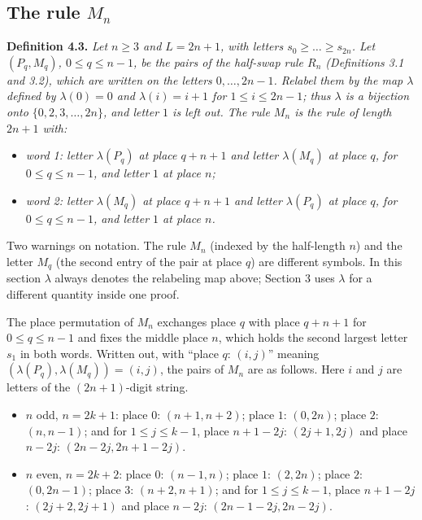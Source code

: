 \documentclass[11pt,letterpaper]{article}
\providecommand{\tightlist}{%
  \setlength{\itemsep}{0pt}\setlength{\parskip}{0pt}}
\theoremstyle{paperstyle}
\theoremstyle{paperstyledef}
\theoremstyle{paperstylerem}
\begin{document}
\subsection{\texorpdfstring{The rule \(M_n\)}{The rule M\_n}}\label{the-rule-m_n}

\textbf{Definition 4.3.} \emph{Let \(n \geq 3\) and \(L = 2n+1\), with letters \(s_0 \geq \dots \geq s_{2n}\). Let \((P_q, M_q)\), \(0 \leq q \leq n-1\), be the pairs of the half-swap rule \(R_n\) (Definitions 3.1 and 3.2), which are written on the letters \(0, \dots, 2n-1\). Relabel them by the map \(\lambda\) defined by \(\lambda(0) = 0\) and \(\lambda(i) = i+1\) for \(1 \leq i \leq 2n-1\); thus \(\lambda\) is a bijection onto \(\{0, 2, 3, \dots, 2n\}\), and letter \(1\) is left out. The rule \(M_n\) is the rule of length \(2n+1\) with:}

\begin{itemize}
\tightlist
\item
  \emph{word 1: letter \(\lambda(P_q)\) at place \(q+n+1\) and letter \(\lambda(M_q)\) at place \(q\), for \(0 \leq q \leq n-1\), and letter \(1\) at place \(n\);}
\item
  \emph{word 2: letter \(\lambda(M_q)\) at place \(q+n+1\) and letter \(\lambda(P_q)\) at place \(q\), for \(0 \leq q \leq n-1\), and letter \(1\) at place \(n\).}
\end{itemize}

Two warnings on notation. The rule \(M_n\) (indexed by the half-length \(n\)) and the letter \(M_q\) (the second entry of the pair at place \(q\)) are different symbols. In this section \(\lambda\) always denotes the relabeling map above; Section 3 uses \(\lambda\) for a different quantity inside one proof.

The place permutation of \(M_n\) exchanges place \(q\) with place \(q+n+1\) for \(0 \leq q \leq n-1\) and fixes the middle place \(n\), which holds the second largest letter \(s_1\) in both words. Written out, with ``place \(q\): \((i, j)\)'' meaning \((\lambda(P_q), \lambda(M_q)) = (i, j)\), the pairs of \(M_n\) are as follows. Here \(i\) and \(j\) are letters of the \((2n+1)\)-digit string.

\begin{itemize}
\tightlist
\item
  \(n\) odd, \(n = 2k+1\): place \(0\): \((n+1, n+2)\); place \(1\): \((0, 2n)\); place \(2\): \((n, n-1)\); and for \(1 \leq j \leq k-1\), place \(n+1-2j\): \((2j+1, 2j)\) and place \(n-2j\): \((2n-2j, 2n+1-2j)\).
\item
  \(n\) even, \(n = 2k+2\): place \(0\): \((n-1, n)\); place \(1\): \((2, 2n)\); place \(2\): \((0, 2n-1)\); place \(3\): \((n+2, n+1)\); and for \(1 \leq j \leq k-1\), place \(n+1-2j\): \((2j+2, 2j+1)\) and place \(n-2j\): \((2n-1-2j, 2n-2j)\).
\end{itemize}
\end{document}
